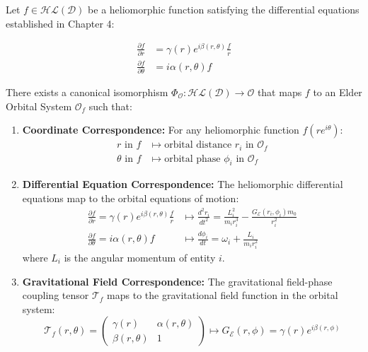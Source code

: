 \begin{theorem}
\label{thm:helio_orbital_isomorphism}
Let $f \in \mathcal{HL}(\mathcal{D})$ be a heliomorphic function satisfying the differential equations established in Chapter 4:

\begin{align}
\frac{\partial f}{\partial r} &= \gamma(r)e^{i\beta(r,\theta)}\frac{f}{r} \\
\frac{\partial f}{\partial \theta} &= i\alpha(r,\theta)f
\end{align}

There exists a canonical isomorphism $\Phi_{\mathcal{O}}: \mathcal{HL}(\mathcal{D}) \rightarrow \mathcal{O}$ that maps $f$ to an Elder Orbital System $\mathcal{O}_f$ such that:

\begin{enumerate}
    \item \textbf{Coordinate Correspondence:} For any heliomorphic function $f(re^{i\theta})$:
    \begin{align}
        r \text{ in } f &\mapsto \text{orbital distance } r_i \text{ in } \mathcal{O}_f \\
        \theta \text{ in } f &\mapsto \text{orbital phase } \phi_i \text{ in } \mathcal{O}_f
    \end{align}
    
    \item \textbf{Differential Equation Correspondence:} The heliomorphic differential equations map to the orbital equations of motion:
    \begin{align}
        \frac{\partial f}{\partial r} = \gamma(r)e^{i\beta(r,\theta)}\frac{f}{r} &\mapsto \frac{d^2r_i}{dt^2} = \frac{L_i^2}{m_ir_i^3} - \frac{G_{\mathcal{E}}(r_i,\phi_i)m_0}{r_i^2} \\
        \frac{\partial f}{\partial \theta} = i\alpha(r,\theta)f &\mapsto \frac{d\phi_i}{dt} = \omega_i + \frac{L_i}{m_ir_i^2}
    \end{align}
    where $L_i$ is the angular momentum of entity $i$.
    
    \item \textbf{Gravitational Field Correspondence:} The gravitational field-phase coupling tensor $\mathcal{T}_f$ maps to the gravitational field function in the orbital system:
    \begin{equation}
        \mathcal{T}_f(r,\theta) = \begin{pmatrix}
            \gamma(r) & \alpha(r,\theta)\\
            \beta(r,\theta) & 1
        \end{pmatrix} \mapsto G_{\mathcal{E}}(r, \phi) = \gamma(r)e^{i\beta(r,\phi)}
    \end{equation}
    

\end{enumerate}
\end{theorem}
